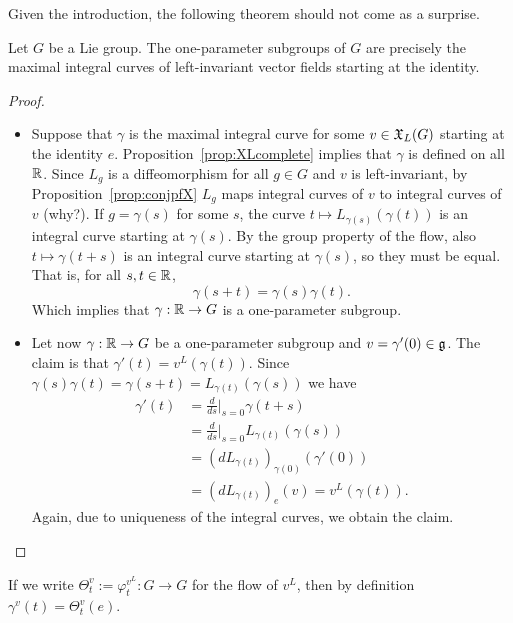 Given the introduction, the following theorem should not come as a surprise.
\begin{theorem}
	Let $G$ be a Lie group.
	The one-parameter subgroups of $G$ are precisely the maximal integral curves of left-invariant vector fields starting at the identity.
\end{theorem}
\begin{proof}
	\begin{itemize}
		\item[($\Longleftarrow$)]
		      Suppose that $\gamma$ is the maximal integral curve for some $v\in\mathfrak{X}_L(G)$ starting at the identity $e$.
		      Proposition~\ref{prop:XLcomplete} implies that $\gamma$ is defined on all $\mathbb{R}$. Since $L_g$ is a diffeomorphism for all $g\in G$ and $v$ is left-invariant, by Proposition~\ref{prop:conjpfX} $L_g$ maps integral curves of $v$ to integral curves of $v$ (why?).
		      If $g=\gamma(s)$ for some $s$, the curve $t\mapsto L_{\gamma(s)}(\gamma(t))$ is an integral curve starting at $\gamma(s)$.
		      By the group property of the flow, also $t\mapsto \gamma(t+s)$ is an integral curve starting at $\gamma(s)$, so they must be equal.
		      That is, for all $s,t\in \mathbb{R}$,
		      \begin{equation}
			      \gamma(s+t) = \gamma(s)\gamma(t).
		      \end{equation}
		      Which implies that $\gamma:\mathbb{R}\to G$ is a one-parameter subgroup.
		\item[($\Longrightarrow$)] Let now $\gamma:\mathbb{R}\to G$ be a one-parameter subgroup and $v = \gamma'(0)\in \mathfrak{g}$.
		      The claim is that $\gamma'(t) = v^L(\gamma(t))$.
		      Since $\gamma(s)\gamma(t) = \gamma(s+t) = L_{\gamma(t)}(\gamma(s))$ we have
		      \begin{align}
			      \gamma'(t) & = \frac{d}{ds}\Big|_{s=0} \gamma(t+s)              \\
			                 & = \frac{d}{ds}\Big|_{s=0} L_{\gamma(t)}(\gamma(s)) \\
			                 & = (dL_{\gamma(t)})_{\gamma(0)}(\gamma'(0))         \\
			                 & = (dL_{\gamma(t)})_{e}(v)
			      = v^L(\gamma(t)).
		      \end{align}
		      Again, due to uniqueness of the integral curves, we obtain the claim.
	\end{itemize}
\end{proof}

If we write $\Theta_t^v:=\varphi^{v^L}_t:G\to G$ for the flow of $v^L$, then by definition $\gamma^v(t) = \Theta_t^v(e)$.


